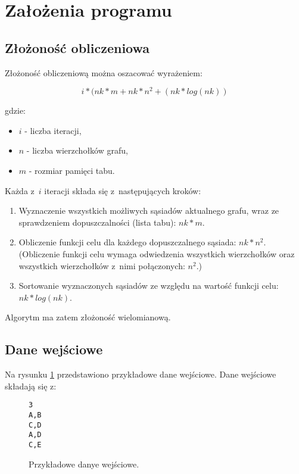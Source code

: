 \section{Założenia programu}

\subsection{Złożoność obliczeniowa}

Złożoność obliczeniową można oszacować wyrażeniem:

\begin{equation}
	i * (nk * m + nk * n^2 + (nk * log(nk))
\end{equation}

\noindent gdzie:

\begin{itemize}
 \item $i$ - liczba iteracji,
 \item $n$ - liczba wierzchołków grafu,
 \item $m$ - rozmiar pamięci tabu.
\end{itemize}

\noindent Każda z~$i$ iteracji składa się z~następujących kroków:

\begin{enumerate}
 \item Wyznaczenie wszystkich możliwych sąsiadów aktualnego grafu, wraz ze sprawdzeniem dopuszczalności (lista tabu): $nk * m$.
 \item Obliczenie funkcji celu dla każdego dopuszczalnego sąsiada: $nk * n^2$. (Obliczenie funkcji celu wymaga odwiedzenia wszystkich wierzchołków oraz wszystkich wierzchołków z~nimi połączonych: $n^2$.)
 \item Sortowanie wyznaczonych sąsiadów ze względu na wartość funkcji celu: $nk * log(nk)$.
\end{enumerate}

\noindent Algorytm ma zatem złożoność wielomianową. 

\subsection{Dane wejściowe}

Na rysunku \ref{fig:input_data} przedstawiono przykładowe dane wejściowe. Dane wejściowe składają się z:

\begin{figure}[ht!]
	\begin{Verbatim}[frame=single]
3
A,B
C,D
A,D
C,E 
	\end{Verbatim}
	\caption{Przykładowe danye wejściowe.}
	\label{fig:input_data}
\end{figure}

